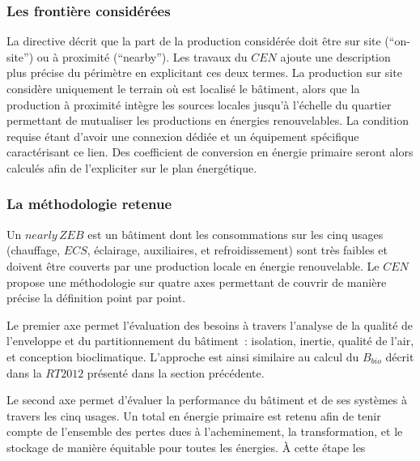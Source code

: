 \subsubsection{Les frontière considérées} %
\label{ssub:les_frontière_considérées}
La directive décrit que la part de la production considérée doit être sur site (\enquote{on-site})
ou à proximité (\enquote{nearby}). Les travaux du $CEN$ ajoute une description plus précise
du périmètre en explicitant ces deux termes. La production sur site considère uniquement
le terrain où est localisé le bâtiment, alors que la production à proximité intègre
les sources locales jusqu’à l’échelle du quartier permettant de mutualiser les productions
en énergies renouvelables.
La condition requise étant d’avoir une connexion dédiée et un équipement spécifique
caractérisant ce lien. Des coefficient de conversion en énergie primaire seront
alors calculés afin de l’expliciter sur le plan énergétique.​



\subsubsection{La méthodologie retenue} %
\label{ssub:la_methodologie_retenue}
Un $nearly\,ZEB$ est un bâtiment dont les consommations sur les cinq usages
(chauffage, $ECS$, éclairage, auxiliaires, et refroidissement)
sont très faibles et doivent être couverts par une production locale en énergie renouvelable.
Le $CEN$ propose une méthodologie sur quatre axes permettant de couvrir de manière
précise la définition point par point.

Le premier axe permet l’évaluation des besoins à travers l’analyse
de la qualité de l’enveloppe et du partitionnement du bâtiment~: isolation, inertie, qualité de l’air,
et conception bioclimatique. L’approche est ainsi similaire au calcul du $B_{bio}$ décrit dans
la $RT 2012$ présenté dans la section précédente.

Le second axe permet d’évaluer la performance du bâtiment et de ses systèmes à travers les
cinq usages. Un total en énergie primaire est retenu afin de tenir compte de l’ensemble
des pertes dues à l’acheminement, la transformation, et le stockage de manière équitable
pour toutes les énergies. À cette étape les

